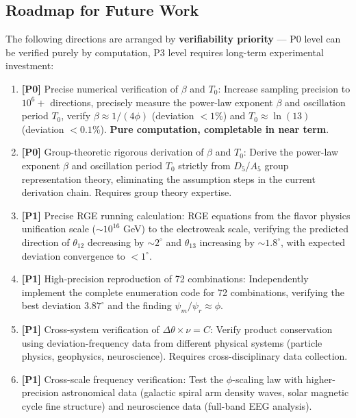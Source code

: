 \subsection{Roadmap for Future Work}
\label{subsec:roadmap}

The following directions are arranged by \textbf{verifiability priority} --- P0 level can be verified purely by computation, P3 level requires long-term experimental investment:

\begin{enumerate}
\item \textbf{[P0]} Precise numerical verification of $\beta$ and $T_0$: Increase sampling precision to $10^6+$ directions, precisely measure the power-law exponent $\beta$ and oscillation period $T_0$, verify $\beta \approx 1/(4\phi)$ (deviation $<1\%$) and $T_0 \approx \ln(13)$ (deviation $<0.1\%$). \textbf{Pure computation, completable in near term}.

\item \textbf{[P0]} Group-theoretic rigorous derivation of $\beta$ and $T_0$: Derive the power-law exponent $\beta$ and oscillation period $T_0$ strictly from $D_5$/$A_5$ group representation theory, eliminating the assumption steps in the current derivation chain. Requires group theory expertise.

\item \textbf{[P1]} Precise RGE running calculation: RGE equations from the flavor physics unification scale ($\sim 10^{16}$ GeV) to the electroweak scale, verifying the predicted direction of $\theta_{12}$ decreasing by $\sim 2^\circ$ and $\theta_{13}$ increasing by $\sim 1.8^\circ$, with expected deviation convergence to $<1^\circ$.

\item \textbf{[P1]} High-precision reproduction of 72 combinations: Independently implement the complete enumeration code for 72 combinations, verifying the best deviation $3.87^\circ$ and the finding $\psi_m/\psi_r \approx \phi$.

\item \textbf{[P1]} Cross-system verification of $\Delta\theta \times \nu = C$: Verify product conservation using deviation-frequency data from different physical systems (particle physics, geophysics, neuroscience). Requires cross-disciplinary data collection.

\item \textbf{[P1]} Cross-scale frequency verification: Test the $\phi$-scaling law with higher-precision astronomical data (galactic spiral arm density waves, solar magnetic cycle fine structure) and neuroscience data (full-band EEG analysis).


\end{enumerate}

